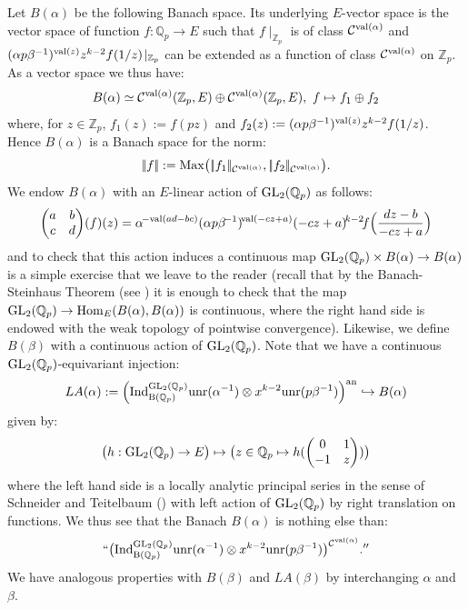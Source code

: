 \documentclass[11pt]{amsart}
\def\Z{{\mathbb Z}_p}
\def\Q{{\mathbb Q}_p}
\def\G{{\rm GL}_2(\Q)}
\def\B{{\rm B}(\Q)}
\begin{document}
Let $B(\alpha)$ be the following Banach space. Its underlying
$E$-vector space is the vector space of function $f:\Q\rightarrow E$
such that $f\!\mid_{\Z}$ is of class ${\mathcal C}^{{\rm
    val}(\alpha)}$ and $(\alpha p\beta^{-1})^{{\rm
    val}(z)}z^{k-2}f(1/z)\!\mid_{\Z}$ can be extended as a function of
class ${\mathcal C}^{{\rm val}(\alpha)}$ on $\Z$. As a vector space we
thus have:  
\begin{eqnarray}\label{f1f2} 
B(\alpha)\simeq {\mathcal C}^{{\rm val}(\alpha)}(\Z,E)\oplus 
{\mathcal C}^{{\rm val}(\alpha)}(\Z,E),\ f\mapsto f_1\oplus f_2 
\end{eqnarray} 
where, for $z\in \Z$, $f_1(z):=f(pz)$ and $f_2(z):=(\alpha
p\beta^{-1})^{{\rm val}(z)}z^{k-2}f(1/z)$. Hence $B(\alpha)$ is a
Banach space for the norm:  
$$|\!|f|\!|:={\rm Max}\big(|\!|f_1|\!|_{{\mathcal C}^{{\rm val}(\alpha)}},|\!|f_2|\!|_{{\mathcal C}^{{\rm val}(\alpha)}}\big).$$ 
We endow $B(\alpha)$ with an $E$-linear action of $\G$ as follows: 
\begin{eqnarray}\label{actionjoe} 
\begin{pmatrix}a&b\\c&d\end{pmatrix}\!(f)(z)
=\alpha^{\!-{\rm val}(ad-bc)}(\alpha p\beta^{\!-1})^{\!{\rm
    val}(-cz+a)}(-cz+a)^{\!k-2}
\!f\Big(\frac{dz-b}{-cz+a}\Big) 
\end{eqnarray} 
and to check that this action induces a continuous map $\G\times
B(\alpha)\rightarrow B(\alpha)$ is a simple exercise that we leave to
the reader (recall that by the Banach-Steinhaus Theorem (see
\cite{Schn}) it is enough to check that the map $\G\rightarrow {\rm
  Hom}_E(B(\alpha),B(\alpha))$ is continuous, where the right hand
side is endowed with the weak topology of pointwise
convergence). Likewise, we define $B(\beta)$ with a continuous action
of $\G$. Note that we have a continuous $\G$-equivariant injection:  
\begin{eqnarray}\label{analytique} 
LA(\alpha):=\Big({\rm Ind}_{\B}^{\G}{\rm unr}(\alpha^{-1})
\otimes x^{k-2}{\rm unr}(p\beta^{-1})\Big)^{\rm an}\hookrightarrow B(\alpha) 
\end{eqnarray} 
given by: 
\begin{eqnarray}\label{groupeqp} 
\big(h:\G\rightarrow E\big)\mapsto \big(z\in \Q\mapsto  
h(\begin{pmatrix}0&1\\-1&z\end{pmatrix})\big) 
\end{eqnarray} 
where the left hand side is a locally analytic principal series in the
sense of Schneider and Teitelbaum (\cite{ST1}) with left action of
$\G$ by right translation on functions. We thus see that the Banach
$B(\alpha)$ is nothing else than:  
$$``\big({\rm Ind}_{\B}^{\G}{\rm unr}(\alpha^{-1})\otimes x^{k-2}{\rm
  unr}(p\beta^{-1})\big)^{{\mathcal C}^{{\rm val}(\alpha)}}.''$$  
We have analogous properties with $B(\beta)$ and $LA(\beta)$ by
interchanging $\alpha$ and $\beta$.  
 
\end{document}
